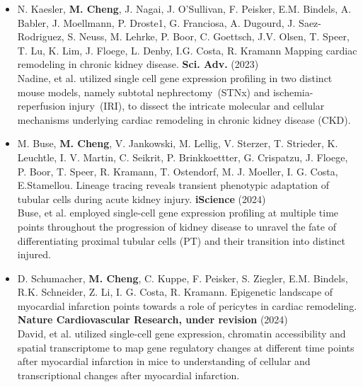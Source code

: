 \begin{addmargin}{0.02\textwidth}
	\begin{itemize}
	\item N. Kaesler, \textbf{M. Cheng}, J. Nagai, J. O’Sullivan, F. Peisker, E.M. Bindels, A. Babler, J. Moellmann, P. Droste1, G. Franciosa, A. Dugourd, J. Saez-Rodriguez, S. Neuss, M. Lehrke, P. Boor, C. Goettsch, J.V. Olsen, T. Speer, T. Lu, K. Lim,
J. Floege, L. Denby, I.G. Costa, R. Kramann Mapping cardiac remodeling in chronic kidney disease. \textbf{Sci. Adv.} (2023)\\

	Nadine, et al. utilized single cell gene expression profiling in two distinct mouse models, namely subtotal nephrectomy~(STNx) and ischemia-reperfusion injury~(IRI), to dissect the intricate molecular and cellular mechanisms underlying cardiac remodeling in chronic kidney disease (CKD). \\
	\end{itemize}
\end{addmargin}

\begin{addmargin}{0.02\textwidth}
	\begin{itemize}
	\item M. Buse, \textbf{M. Cheng}, V. Jankowski, M. Lellig, V. Sterzer, T. Strieder, K. Leuchtle, I. V. Martin, C. Seikrit, P. Brinkkoettter, G. Crispatzu, J. Floege, P. Boor, T. Speer, R. Kramann, T. Ostendorf, M. J. Moeller, I. G. Costa, E.Stamellou. Lineage tracing reveals transient phenotypic adaptation of tubular cells during acute kidney injury. \textbf{iScience} (2024)  \\

	Buse, et al. employed single-cell gene expression profiling at multiple time points throughout the progression of kidney disease to unravel the fate of differentiating proximal tubular cells (PT) and their transition into distinct injured. \\
	\end{itemize}
\end{addmargin}



\begin{addmargin}{0.02\textwidth}
	\begin{itemize}
	\item D. Schumacher, \textbf{M. Cheng}, C. Kuppe, F. Peisker, S. Ziegler, E.M. Bindels, R.K. Schneider,  Z. Li,  I. G. Costa, R. Kramann. Epigenetic landscape of myocardial infarction points towards a role of pericytes in cardiac remodeling. \textbf{Nature Cardiovascular Research, under revision} (2024) \\

	David, et al. utilized single-cell gene expression, chromatin accessibility and spatial transcriptome to map gene regulatory changes  at different time points after myocardial infarction in mice to understanding of cellular and transcriptional changes after myocardial infarction.\\
	\end{itemize}
\end{addmargin}



